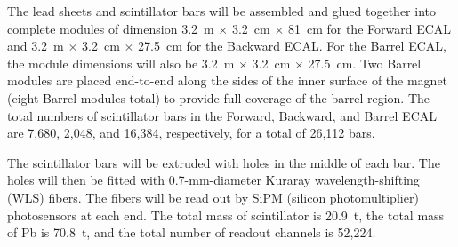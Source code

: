 The lead sheets and scintillator bars will be assembled and glued together
into complete modules of dimension 
3.2~m $\times$ 3.2~cm $\times$ 81~cm for the Forward ECAL and
3.2~m $\times$ 3.2~cm $\times$ 27.5~cm for the Backward ECAL. For the Barrel ECAL, the module 
dimensions will also be 
3.2~m $\times$ 3.2~cm $\times$ 27.5~cm. Two Barrel modules are placed end-to-end 
along the sides of the inner surface of the magnet (eight Barrel modules
total) to provide full coverage of the barrel region.
The total numbers of scintillator bars in the
Forward, Backward, and Barrel ECAL are 7,680, 2,048, and 16,384, respectively, 
for a total of 26,112 bars. 

The scintillator bars will be extruded with 
holes in the middle of each bar. The
holes will then be fitted with 0.7-mm-diameter Kuraray wavelength-shifting (WLS) fibers.
The fibers will be read out by SiPM (silicon photomultiplier) photosensors at each end.
The total mass of scintillator is 20.9~t, 
the total mass of Pb is 70.8~t, and
the total number of readout channels is 52,224. 

